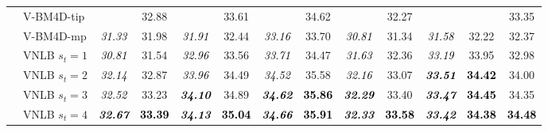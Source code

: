 \documentclass[10pt, a4paper]{article}
\newcommand{\best}[1]{#1}
\newcommand{\bsic}[1]{\textcolor{black}{\textit{#1}}}
\newcommand{\Bsic}[1]{\textcolor{black}{\textbf{\textit{#1}}}}
\newcommand{\Best}[1]{\textbf{\textcolor{black}{#1}}}
\begin{document}
\begin{table}[htp!]
\begin{center}
{\begin{tabular}{ c | l |c c | c c | c c | c c | c c | c}
			                      & V-BM4D-tip           & \bsic{     } & \best{32.88} & \bsic{     } & \best{33.61} & \bsic{     } & \best{34.62} & \bsic{     } & \best{32.27} & \bsic{     } & \best{     } & \best{33.35} \\
			                      & V-BM4D-mp            & \bsic{31.33} &       31.98  & \bsic{31.91} &       32.44  & \bsic{33.16} &       33.70  & \bsic{30.81} &       31.34  & \bsic{31.58} &       32.22  &       32.37  \\
			                      & VNLB   $s_t = 1$     & \bsic{30.81} &       31.54  & \bsic{32.96} &       33.56  & \bsic{33.71} &       34.47  & \bsic{31.63} &       32.36  & \bsic{33.19} &       33.95  &       32.98  \\
			                      & VNLB   $s_t = 2$     & \bsic{32.14} &       32.87  & \bsic{33.96} &       34.49  & \bsic{34.52} &       35.58  & \bsic{32.16} &       33.07  & \Bsic{33.51} & \Best{34.42} &       34.00  \\
			                      & VNLB   $s_t = 3$     & \bsic{32.52} &       33.23  & \Bsic{34.10} &       34.89  & \Bsic{34.62} & \Best{35.86} & \Bsic{32.29} &       33.40  & \Bsic{33.47} & \Best{34.45} &       34.35  \\
			                      & VNLB   $s_t = 4$     & \Bsic{32.67} & \Best{33.39} & \Bsic{34.13} & \Best{35.04} & \Bsic{34.66} & \Best{35.91} & \Bsic{32.33} & \Best{33.58} & \Bsic{33.42} & \Best{34.38} & \Best{34.48} \\\hline

\end{tabular}}
\end{center}
\end{table}
\end{document}
